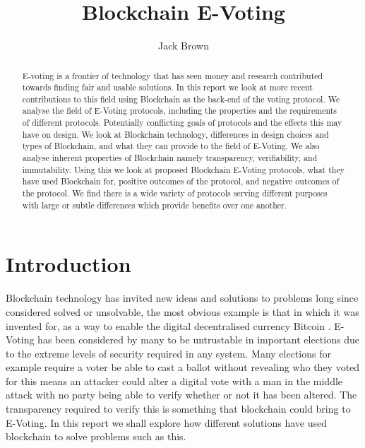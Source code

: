 \documentclass{llncs}
\title{Blockchain E-Voting}
\author{Jack Brown}
\institute{School of Computing Science\\ Newcastle University\\ Newcastle upon Tyne, NE1 7RU}
\begin{document}
\maketitle

\begin{abstract}

E-voting is a frontier of technology that has seen money and research contributed towards finding fair and usable solutions. In this report we look at more recent contributions to this field using Blockchain as the back-end of the voting protocol. We analyse the field of E-Voting protocols, including the properties and the requirements of different protocols. Potentially conflicting goals of protocols and the effects this may have on design. We look at Blockchain technology, differences in design choices and types of Blockchain, and what they can provide to the field of E-Voting. We also analyse inherent properties of Blockchain namely transparency, verifiability, and immutability. Using this we look at proposed Blockchain E-Voting protocols, what they have used Blockchain for, positive outcomes of the protocol, and negative outcomes of the protocol. We find there is a wide variety of protocols serving different purposes with large or subtle differences which provide benefits over one another.

\end{abstract}

\section{Introduction}
%
Blockchain technology has invited new ideas and solutions to problems long since considered solved or unsolvable, the most obvious example is that in which it was invented for, as a way to enable the digital decentralised currency Bitcoin \cite{BTCWhitepaper}. E-Voting has been considered by many to be untrustable in important elections due to the extreme levels of security required in any system\cite{lauer2004risk}. Many elections for example require a voter be able to cast a ballot without revealing who they voted for this means an attacker could alter a digital vote with a man in the middle attack with no party being able to verify whether or not it has been altered. The transparency required to verify this is something that blockchain could bring to E-Voting. In this report we shall explore how different solutions have used blockchain to solve problems such as this.
\end{document}
